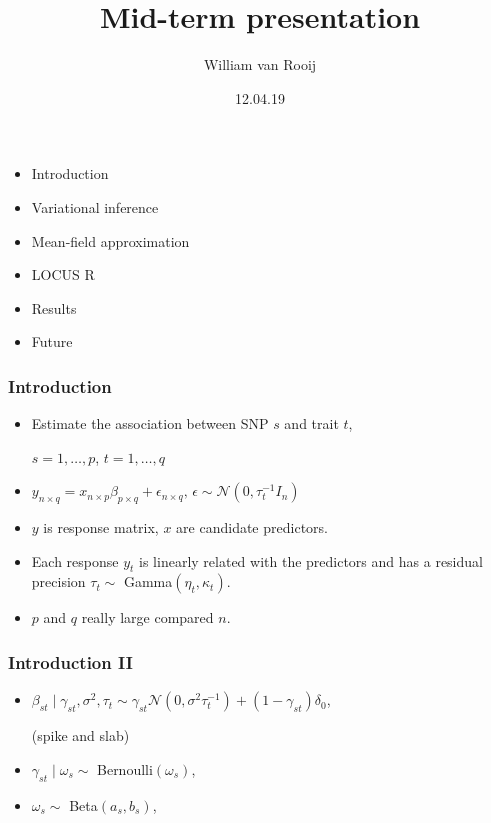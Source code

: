 \documentclass{beamer}
\begin{document}
\title{Mid-term presentation}
\author{William van Rooij}
\date{12.04.19}
\maketitle
\begin{frame}
\begin{itemize}
\item Introduction
\item Variational inference
\item Mean-field approximation
\item LOCUS R
\item Results
\item Future
\end{itemize}
\end{frame}
\begin{frame}
\frametitle{Introduction}
\begin{itemize}
\item Estimate the association between SNP $s$ and trait $t$,

$s = 1,\ldots,p$, $t=1,\ldots ,q$
\item $y_{n\times q} = x_{n\times p}\beta_{p \times q} + \epsilon_{n\times q}\text{, }\epsilon \sim \mathcal{N}(0,\tau_t^{-1}I_n)$
\item $y$ is response matrix, $x$ are candidate predictors.

\item Each response $y_t$ is linearly related with the predictors and has a residual precision $\tau_t \sim $ Gamma$(\eta_t, \kappa_t)$.

\item $p$ and $q$ really large compared $n$.
\end{itemize}
\end{frame}
\begin{frame}
\frametitle{Introduction II}
\begin{itemize}

\item $\beta_{st}\mid\gamma_{st},\sigma^2,\tau_t \sim \gamma_{st}\mathcal{N}(0,\sigma^2\tau_t^{-1})+(1-\gamma_{st})\delta_0$,

(spike and slab)

\item $\gamma_{st} \mid \omega_{s} \sim $ Bernoulli$(\omega_s)$,

\item $\omega_s \sim $ Beta$(a_s,b_s)$,

\end{itemize}

\end{frame}
\end{document}
